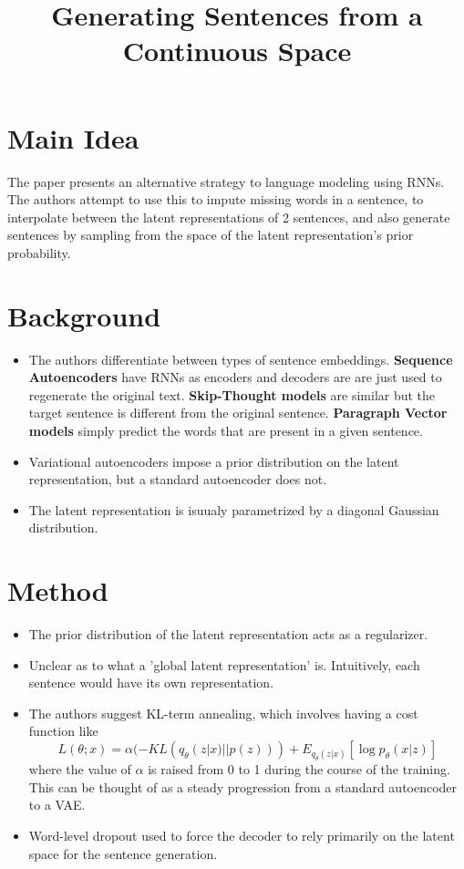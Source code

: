 \documentclass[12pt]{scrartcl}
\begin{document}
\title{Generating Sentences from a Continuous Space}
\author{}
\date{}
\maketitle

\section{Main Idea}
  The paper presents an alternative strategy to language modeling using RNNs. The authors attempt to use this to impute missing words in a sentence, to interpolate between the latent representations of 2 sentences, and also generate sentences by sampling from the space of the latent representation's prior probability. \cite{bowman2016generating}

\section{Background}
  \begin{itemize}
    \item The authors differentiate between types of sentence embeddings. \textbf{Sequence Autoencoders} have RNNs as encoders and decoders are are just used to regenerate the original text. \textbf{Skip-Thought models} are similar but the target sentence is different from the original sentence. \textbf{Paragraph Vector models} simply predict the words that are present in a given sentence.
    \item Variational autoencoders impose a prior distribution on the latent representation, but a standard autoencoder does not.
    \item The latent representation is isuualy parametrized by a diagonal Gaussian distribution.
  \end{itemize}

\section{Method}
  \begin{itemize}
    \item The prior distribution of the latent representation acts as a regularizer.
    \item Unclear as to what a 'global latent representation' is. Intuitively, each sentence would have its own representation.
    \item The authors suggest KL-term annealing, which involves having a cost function like
    $$L(\theta; x) = \alpha (-KL(q_{\theta}(z|x)||p(z))) + E_{q_{\theta}(z|x)}[\log p_{\theta}(x|z)]$$ where the value of $\alpha$ is raised from 0 to 1 during the course of the training. This can be thought of as a steady progression from a standard autoencoder to a VAE.
    \item Word-level dropout used to force the decoder to rely primarily on the latent space for the sentence generation.
  \end{itemize}
\end{document}
